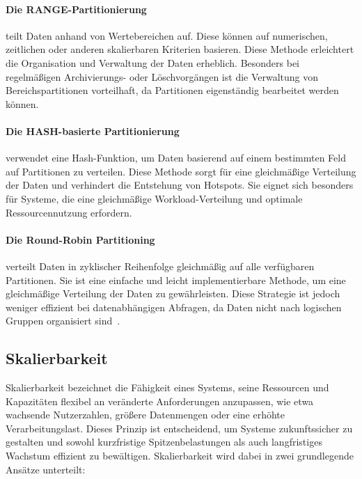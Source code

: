 \paragraph{Die RANGE-Partitionierung} teilt Daten anhand von Wertebereichen auf.
Diese können auf numerischen, zeitlichen oder anderen skalierbaren Kriterien basieren.
Diese Methode erleichtert die Organisation und Verwaltung der Daten erheblich.
Besonders bei regelmäßigen Archivierungs- oder Löschvorgängen ist die Verwaltung von Bereichspartitionen vorteilhaft,
da Partitionen eigenständig bearbeitet werden können.
\paragraph{Die HASH-basierte Partitionierung} verwendet eine Hash-Funktion, um Daten basierend auf einem bestimmten
Feld auf Partitionen zu verteilen.
Diese Methode sorgt für eine gleichmäßige Verteilung der Daten und verhindert die Entstehung von Hotspots.
Sie eignet sich besonders für Systeme, die eine gleichmäßige Workload-Verteilung und optimale Ressourcennutzung erfordern.
\paragraph{Die Round-Robin Partitioning} verteilt Daten in zyklischer Reihenfolge gleichmäßig auf alle verfügbaren Partitionen.
Sie ist eine einfache und leicht implementierbare Methode, um eine gleichmäßige Verteilung der Daten zu gewährleisten.
Diese Strategie ist jedoch weniger effizient bei datenabhängigen Abfragen,
da Daten nicht nach logischen Gruppen organisiert sind~\cite{g4g-partitioning}.



\subsection{Skalierbarkeit}

Skalierbarkeit bezeichnet die Fähigkeit eines Systems, seine Ressourcen und Kapazitäten flexibel an
veränderte Anforderungen anzupassen, wie etwa wachsende Nutzerzahlen, größere Datenmengen oder eine erhöhte Verarbeitungslast.
Dieses Prinzip ist entscheidend, um Systeme zukunftssicher zu gestalten und sowohl kurzfristige Spitzenbelastungen als auch
langfristiges Wachstum effizient zu bewältigen.
Skalierbarkeit wird dabei in zwei grundlegende Ansätze unterteilt:



